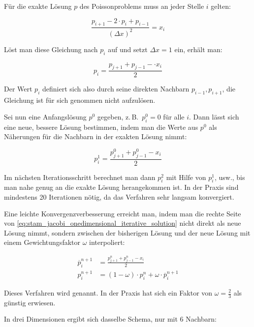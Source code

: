 Für die exakte Lösung $p$ des Poissonproblems muss an jeder Stelle $i$ gelten:

\begin{equation}
\label{eq:stam_jacobi_onedimensional}
\frac{
	p_{i+1} -
	2 \cdot p_{i} +
	p_{i-1}
}
{
	(\Delta x)^2
}
=
x_i
\end{equation}

Löst man diese Gleichung nach $p_i$ auf und setzt $\Delta x = 1$ ein, erhält
man:

\begin{equation}
p_i
=
\frac{
	p_{j+1} +
	p_{j-1} -
	\cdot x_i
}
{
	2
}
\end{equation}

Der Wert $p_i$ definiert sich also durch seine direkten Nachbarn $p_{i-1},
p_{i+1}$, die Gleichung ist für sich genommen nicht aufzulösen.

Sei nun eine Anfangslösung $p^0$ gegeben, z.\,B.\ $p^0_i = 0$ für alle $i$.
Dann lässt sich eine neue, bessere Lösung bestimmen, indem man die Werte aus
$p^0$ als Näherungen für die Nachbarn in der exakten Lösung nimmt:

\begin{equation}
\label{eq:stam_jacobi_onedimensional_iterative_solution}
p_i^1
=
\frac{
	p_{j+1}^{0} + p_{j-1}^{0} - x_i
}
{
	2
}
\end{equation}

Im nächsten Iterationsschritt berechnet man dann $p_i^2$ mit Hilfe von $p_i^1$,
usw., bis man nahe genug an die exakte Lösung herangekommen ist. In der Praxis
sind mindestens 20 Iterationen nötig, da das Verfahren sehr langsam konvergiert.

Eine leichte Konvergenzverbesserung erreicht man, indem man die rechte Seite von
\autoref{eq:stam_jacobi_onedimensional_iterative_solution} nicht direkt als neue
Lösung nimmt, sondern zwischen der bisherigen Lösung und der neue Lösung mit
einem Gewichtungsfaktor $\omega$ interpoliert:

\begin{align}
\overline{p}_i^{n+1}
&=
\frac{
	p_{j+1}^{n} + p_{j-1}^{n} - x_i
}
{
	2
} \\
p_i^{n+1}
&=
(1-\omega) \cdot p_i^n + \omega \cdot \overline{p}_i^{n+1}
\end{align}

Dieses Verfahren wird  genannt. In
der Praxis hat sich ein Faktor von $\omega=\frac{2}{3}$ als günstig erwiesen.

In drei Dimensionen ergibt sich dasselbe Schema, nur mit 6 Nachbarn:

